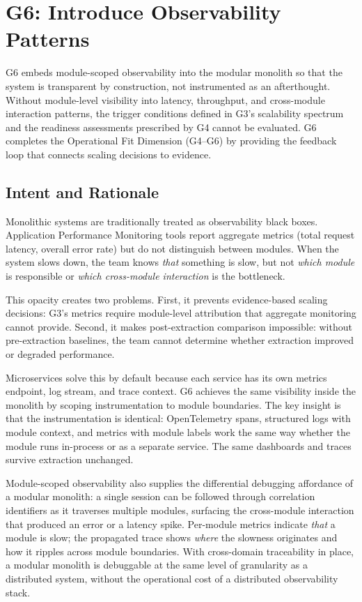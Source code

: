 \pagebreak
\section{G6: Introduce Observability Patterns}
\label{sec:g6-introduce-observability-patterns}

G6 embeds module-scoped observability into the modular monolith so that the system is transparent by construction, not instrumented as an afterthought. Without module-level visibility into latency, throughput, and cross-module interaction patterns, the trigger conditions defined in G3's scalability spectrum and the readiness assessments prescribed by G4 cannot be evaluated. G6 completes the Operational Fit Dimension (G4--G6) by providing the feedback loop that connects scaling decisions to evidence.

\subsection*{Intent and Rationale}

Monolithic systems are traditionally treated as observability black boxes. Application Performance Monitoring tools report aggregate metrics (total request latency, overall error rate) but do not distinguish between modules. When the system slows down, the team knows \emph{that} something is slow, but not \emph{which module} is responsible or \emph{which cross-module interaction} is the bottleneck.

This opacity creates two problems. First, it prevents evidence-based scaling decisions: G3's metrics require module-level attribution that aggregate monitoring cannot provide. Second, it makes post-extraction comparison impossible: without pre-extraction baselines, the team cannot determine whether extraction improved or degraded performance.

Microservices solve this by default because each service has its own metrics endpoint, log stream, and trace context. G6 achieves the same visibility inside the monolith by scoping instrumentation to module boundaries. The key insight is that the instrumentation is identical: OpenTelemetry spans, structured logs with module context, and metrics with module labels work the same way whether the module runs in-process or as a separate service. The same dashboards and traces survive extraction unchanged.

Module-scoped observability also supplies the differential debugging affordance of a modular monolith: a single session can be followed through correlation identifiers as it traverses multiple modules, surfacing the cross-module interaction that produced an error or a latency spike. Per-module metrics indicate \emph{that} a module is slow; the propagated trace shows \emph{where} the slowness originates and how it ripples across module boundaries. With cross-domain traceability in place, a modular monolith is debuggable at the same level of granularity as a distributed system, without the operational cost of a distributed observability stack.

